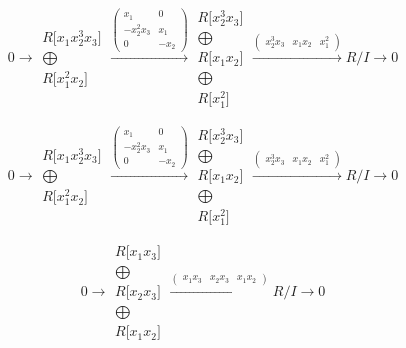 \documentclass[12pt,a3paper,landscape]{amsart}
\numberwithin{equation}{section}
\theoremstyle{plain}
\theoremstyle{definition}
\begin{document}
$$
0 \rightarrow \begin{matrix}
R \lbrack x_{1}x_{2}^{3}x_{3} \rbrack \\ \bigoplus \\
R \lbrack x_{1}^{2}x_{2} \rbrack
\end{matrix}
\xrightarrow{\left( \begin{matrix}
x_{1} & 0 \\
-x_{2}^{2}x_{3} & x_{1} \\
0 & -x_{2}
\end{matrix} \right)}\begin{matrix}
R \lbrack x_{2}^{3}x_{3} \rbrack \\ \bigoplus \\
R \lbrack x_{1}x_{2} \rbrack \\ \bigoplus \\
R \lbrack x_{1}^{2} \rbrack
\end{matrix}
\xrightarrow{\left( \begin{matrix}
x_{2}^{3}x_{3} & x_{1}x_{2} & x_{1}^{2}
\end{matrix} \right)} R/I \rightarrow 0
$$

$$
0 \rightarrow \begin{matrix}
R \lbrack x_{1}x_{2}^{3}x_{3} \rbrack \\ \bigoplus \\
R \lbrack x_{1}^{2}x_{2} \rbrack
\end{matrix}
\xrightarrow{\left( \begin{matrix}
x_{1} & 0 \\
-x_{2}^{2}x_{3} & x_{1} \\
0 & -x_{2}
\end{matrix} \right)}\begin{matrix}
R \lbrack x_{2}^{3}x_{3} \rbrack \\ \bigoplus \\
R \lbrack x_{1}x_{2} \rbrack \\ \bigoplus \\
R \lbrack x_{1}^{2} \rbrack
\end{matrix}
\xrightarrow{\left( \begin{matrix}
x_{2}^{3}x_{3} & x_{1}x_{2} & x_{1}^{2}
\end{matrix} \right)} R/I \rightarrow 0
$$

$$
0 \rightarrow \begin{matrix}
R \lbrack x_{1}x_{3} \rbrack \\ \bigoplus \\
R \lbrack x_{2}x_{3} \rbrack \\ \bigoplus \\
R \lbrack x_{1}x_{2} \rbrack
\end{matrix}
\xrightarrow{\left( \begin{matrix}
x_{1}x_{3} & x_{2}x_{3} & x_{1}x_{2}
\end{matrix} \right)} R/I \rightarrow 0
$$
\end{document}

